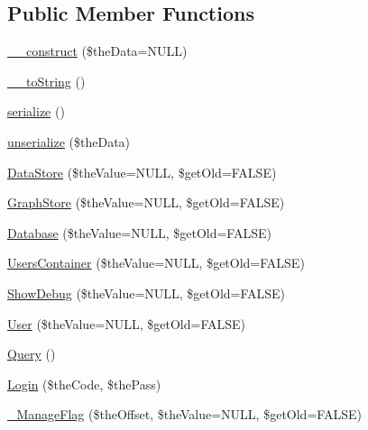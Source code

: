 \subsection*{Public Member Functions}
\begin{DoxyCompactItemize}
\item 
\hyperlink{class_c_session_object_acf74287ee98aac046da0a13525029eb8}{\-\_\-\-\_\-construct} (\$the\-Data=N\-U\-L\-L)
\item 
\hyperlink{class_c_session_object_a991b6282a430f35b5acf2ad6cd4e5c39}{\-\_\-\-\_\-to\-String} ()
\item 
\hyperlink{class_c_session_object_a37b9597dba12c0cc62c444e1b371634d}{serialize} ()
\item 
\hyperlink{class_c_session_object_a50d1ad704f51fc6cfa1abeba00908cb6}{unserialize} (\$the\-Data)
\item 
\hyperlink{class_c_session_object_a3c2fb7a5f1bfd878b5336944679c01fa}{Data\-Store} (\$the\-Value=N\-U\-L\-L, \$get\-Old=F\-A\-L\-S\-E)
\item 
\hyperlink{class_c_session_object_a7fd05281e6d014677e739845436d5451}{Graph\-Store} (\$the\-Value=N\-U\-L\-L, \$get\-Old=F\-A\-L\-S\-E)
\item 
\hyperlink{class_c_session_object_ae2e67e9c788e6a55568ae96b1f74b64f}{Database} (\$the\-Value=N\-U\-L\-L, \$get\-Old=F\-A\-L\-S\-E)
\item 
\hyperlink{class_c_session_object_aefd5962093881fa488ccf86f6f717a20}{Users\-Container} (\$the\-Value=N\-U\-L\-L, \$get\-Old=F\-A\-L\-S\-E)
\item 
\hyperlink{class_c_session_object_a14919fc60dd7f99c69d55d6ec1e80578}{Show\-Debug} (\$the\-Value=N\-U\-L\-L, \$get\-Old=F\-A\-L\-S\-E)
\item 
\hyperlink{class_c_session_object_a1ef83c2632d67bff14b8e07960433441}{User} (\$the\-Value=N\-U\-L\-L, \$get\-Old=F\-A\-L\-S\-E)
\item 
\hyperlink{class_c_session_object_a80ee4a2049ab1f0aa962b346f1e75f05}{Query} ()
\item 
\hyperlink{class_c_session_object_a2835ebc41e4ca641476b0cf12d0782a4}{Login} (\$the\-Code, \$the\-Pass)
\item 
\hyperlink{class_c_session_object_a9e1e72a26c0450261e93435710150cf4}{\-\_\-\-Manage\-Flag} (\$the\-Offset, \$the\-Value=N\-U\-L\-L, \$get\-Old=F\-A\-L\-S\-E)
\end{DoxyCompactItemize}
